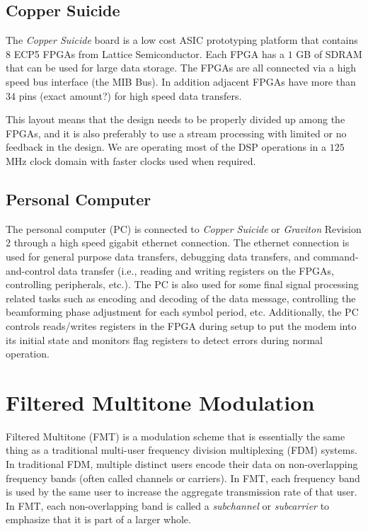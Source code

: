 \documentclass[conference]{IEEEtran}
\begin{document}
\subsection*{Copper Suicide}

The \emph{Copper Suicide} board is a low cost ASIC prototyping platform that contains
$8$ ECP5 FPGAs from Lattice Semiconductor. Each FPGA has a $1$ GB of SDRAM that can be
used for large data storage. The FPGAs are all connected via a high speed bus interface
(the MIB Bus). In addition adjacent FPGAs have more than $34$ pins (exact amount?) for
high speed data transfers.

This layout means that the design needs to be properly divided up among the FPGAs, and
it is also preferably to use a stream processing with limited or no feedback in the design.
We are operating most of the DSP operations in a $125$ MHz clock domain with faster
clocks used when required.

\subsection*{Personal Computer}

The personal computer (PC) is connected to \emph{Copper Suicide} or \emph{Graviton}
Revision 2 through a high speed gigabit ethernet connection. The ethernet connection
is used for general purpose data transfers, debugging data transfers, and
command-and-control data transfer (i.e., reading and writing registers on the FPGAs,
controlling peripherals, etc.).
The PC is also used for some final signal processing related tasks such as encoding
and decoding of the data message, controlling the beamforming phase adjustment for
each symbol period, etc. Additionally, the PC controls reads/writes registers in
the FPGA during setup to put the modem into its initial state and monitors flag
registers to detect errors during normal operation.

\section{Filtered Multitone Modulation}
\label{sec:FMTintro}

Filtered Multitone (FMT) is a modulation scheme that is essentially the same thing
as a traditional multi-user frequency division multiplexing (FDM) systems. In
traditional FDM, multiple distinct users encode their data on non-overlapping
frequency bands (often called channels or carriers). In FMT, each frequency band
is used by the same user to increase the aggregate transmission rate of that
user. In FMT, each non-overlapping band is called a \emph{subchannel} or
\emph{subcarrier} to emphasize that it is part of a larger whole.
\end{document}
